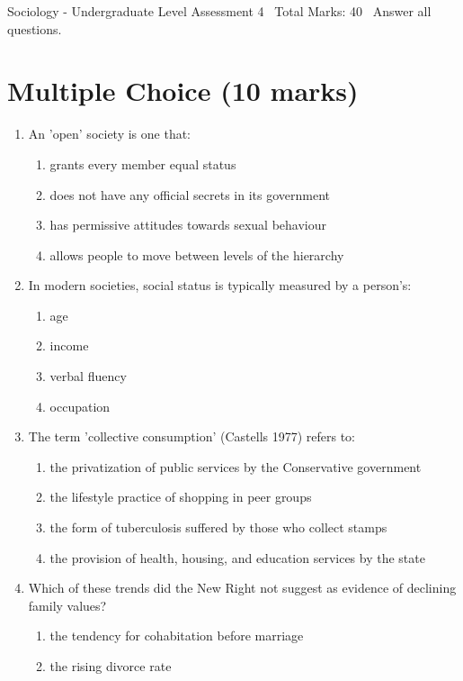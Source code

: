 \documentclass[12pt]{article}
\begin{document}
\begin{center}
Sociology - Undergraduate Level Assessment 4 \
Total Marks: 40 \
Answer all questions.
\end{center}

\section*{Multiple Choice (10 marks)}
\begin{enumerate}[label=\arabic*.]
\item An 'open' society is one that:
\begin{enumerate}[label=(\alph*)]
    \item grants every member equal status
    \item does not have any official secrets in its government
    \item has permissive attitudes towards sexual behaviour
    \item allows people to move between levels of the hierarchy
\end{enumerate}
\item In modern societies, social status is typically measured by a person's:
\begin{enumerate}[label=(\alph*)]
    \item age
    \item income
    \item verbal fluency
    \item occupation
\end{enumerate}
\item The term 'collective consumption' (Castells 1977) refers to:
\begin{enumerate}[label=(\alph*)]
    \item the privatization of public services by the Conservative government
    \item the lifestyle practice of shopping in peer groups
    \item the form of tuberculosis suffered by those who collect stamps
    \item the provision of health, housing, and education services by the state
\end{enumerate}
\item Which of these trends did the New Right not suggest as evidence of declining family values?
\begin{enumerate}[label=(\alph*)]
    \item the tendency for cohabitation before marriage
    \item the rising divorce rate

\end{enumerate}
\end{enumerate}
\end{document}
